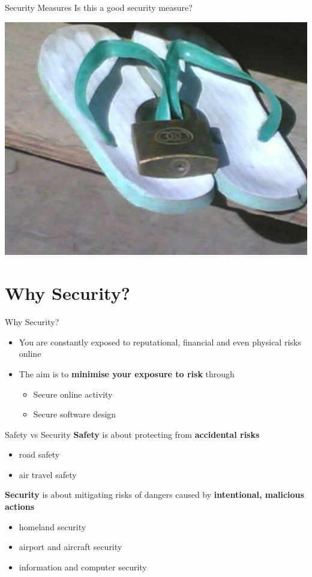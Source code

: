 \documentclass{beamer}
\begin{document}
\begin{frame}{Security Measures}
Is this a good security measure?
\begin{center}
\includegraphics[width=0.6\linewidth]{flipflops.png}
\end{center}
\end{frame}

\section{Why Security?}
\frame{\sectionpage}

\begin{frame}{Why Security?}
	\begin{itemize}
		\item You are constantly exposed to reputational, financial and even physical risks online
		\item The aim is to \textbf{minimise your exposure to risk} through
        \begin{itemize}
        	\item Secure online activity
            \item Secure software design
        \end{itemize}
	\end{itemize}
\end{frame}

\begin{frame}{Safety vs Security}
\textbf{Safety} is about protecting from \textbf{accidental risks} 
\begin{itemize}
\item road safety
\item  air travel safety
\end{itemize}
\textbf{Security} is about mitigating risks of dangers
caused by \textbf{intentional, malicious actions} 
\begin{itemize}
\item homeland security
\item airport and aircraft security
\item information and computer security
\end{itemize}
\end{frame}
\end{document}

